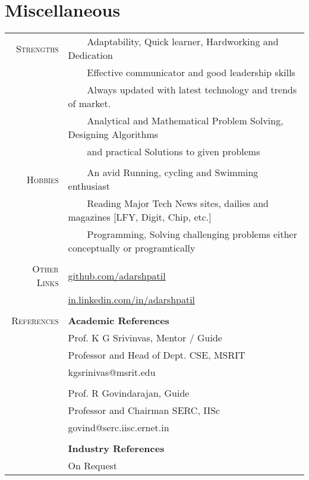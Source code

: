 \documentclass[a4paper,10pt]{article} %
\newcommand{\tabitem}{~~\llap{\textbullet}~~}
\begin{document}


\section{Miscellaneous}
\begin{tabular}{rl}
\textsc{Strengths} & \tabitem Adaptability, Quick learner, Hardworking and Dedication\\
& \tabitem Effective communicator and good leadership skills \\
& \tabitem Always updated with latest technology and trends of market.\\
& \tabitem Analytical and Mathematical Problem Solving, Designing Algorithms \\
& ~~~~and practical Solutions to given problems \\
& \\
\textsc{Hobbies} & \tabitem An avid Running, cycling and Swimming enthusiast\\
& \tabitem Reading Major Tech News sites, dailies and magazines [LFY, Digit, Chip, etc.] \\
& \tabitem Programming, Solving challenging problems either conceptually or programtically \\
& \\
\textsc{Other Links} & \href{https://github.com/adarshpatil}{github.com/adarshpatil} \\
& \href{http://in.linkedin.com/in/adarshpatil}{in.linkedin.com/in/adarshpatil}\\
&\\
\textsc{References} & \textbf{Academic References} \\
& Prof. K G Srivinvas, Mentor / Guide  \\
& Professor and Head of Dept. CSE, MSRIT \\
& kgsrinivas@msrit.edu \\
&\\
& Prof. R Govindarajan, Guide \\
& Professor and Chairman SERC, IISc\\
& govind@serc.iisc.ernet.in \\
&\\
& \textbf{Industry References} \\
& On Request \\
\end{tabular}
\end{document}
